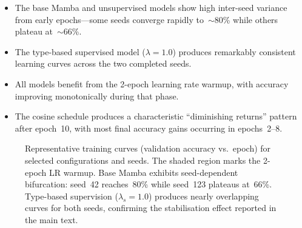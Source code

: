 \documentclass[conference]{IEEEtran}
\begin{document}
\begin{itemize}[nosep]
    \item The base Mamba and unsupervised models show high
          inter-seed variance from early epochs---some seeds
          converge rapidly to~$\sim$80\% while others plateau
          at~$\sim$66\%.
    \item The type-based supervised model ($\lambda{=}1.0$)
          produces remarkably consistent learning curves across
          the two completed seeds.
    \item All models benefit from the 2-epoch learning rate
          warmup, with accuracy improving monotonically during
          that phase.
    \item The cosine schedule produces a characteristic
          ``diminishing returns'' pattern after epoch~10,
          with most final accuracy gains occurring in
          epochs~2--8.
\end{itemize}

\begin{figure}[H]
\centering
{}
\caption{Representative training curves (validation accuracy
vs.\ epoch) for selected configurations and seeds.  The shaded
region marks the 2-epoch LR warmup.  Base Mamba exhibits
seed-dependent bifurcation: seed~42 reaches~80\% while seed~123
plateaus at~66\%.  Type-based supervision ($\lambda_s{=}1.0$)
produces nearly overlapping curves for both seeds, confirming
the stabilisation effect reported in the main text.}
\label{fig:app_training}
\end{figure}
\end{document}
